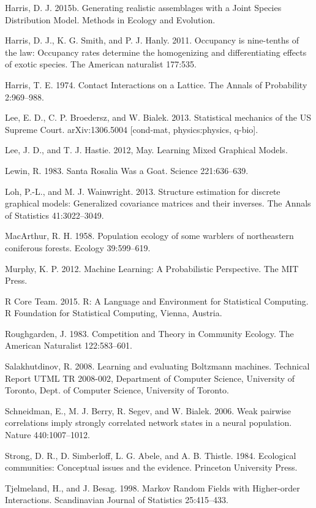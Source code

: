 \documentclass[12pt,]{article}
\begin{document}
\begin{spacing}{1.9}
\begin{flushleft}
Harris, D. J. 2015b. Generating realistic assemblages with a Joint
Species Distribution Model. Methods in Ecology and Evolution.

Harris, D. J., K. G. Smith, and P. J. Hanly. 2011. Occupancy is
nine-tenths of the law: Occupancy rates determine the homogenizing and
differentiating effects of exotic species. The American naturalist
177:535.

Harris, T. E. 1974. Contact Interactions on a Lattice. The Annals of
Probability 2:969--988.

Lee, E. D., C. P. Broedersz, and W. Bialek. 2013. Statistical mechanics
of the US Supreme Court. arXiv:1306.5004 {[}cond-mat, physics:physics,
q-bio{]}.

Lee, J. D., and T. J. Hastie. 2012, May. Learning Mixed Graphical
Models.

Lewin, R. 1983. Santa Rosalia Was a Goat. Science 221:636--639.

Loh, P.-L., and M. J. Wainwright. 2013. Structure estimation for
discrete graphical models: Generalized covariance matrices and their
inverses. The Annals of Statistics 41:3022--3049.

MacArthur, R. H. 1958. Population ecology of some warblers of
northeastern coniferous forests. Ecology 39:599--619.

Murphy, K. P. 2012. Machine Learning: A Probabilistic Perspective. The
MIT Press.

R Core Team. 2015. R: A Language and Environment for Statistical
Computing. R Foundation for Statistical Computing, Vienna, Austria.

Roughgarden, J. 1983. Competition and Theory in Community Ecology. The
American Naturalist 122:583--601.

Salakhutdinov, R. 2008. Learning and evaluating Boltzmann machines.
Technical Report UTML TR 2008-002, Department of Computer Science,
University of Toronto, Dept. of Computer Science, University of Toronto.

Schneidman, E., M. J. Berry, R. Segev, and W. Bialek. 2006. Weak
pairwise correlations imply strongly correlated network states in a
neural population. Nature 440:1007--1012.

Strong, D. R., D. Simberloff, L. G. Abele, and A. B. Thistle. 1984.
Ecological communities: Conceptual issues and the evidence. Princeton
University Press.

Tjelmeland, H., and J. Besag. 1998. Markov Random Fields with
Higher-order Interactions. Scandinavian Journal of Statistics
25:415--433.


\end{flushleft}
\end{spacing}
\end{document}
